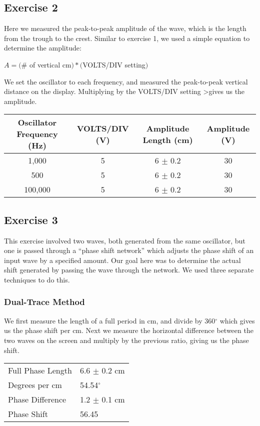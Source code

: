 \documentclass[a4paper,12pt]{article}
\begin{document}
\subsection{Exercise 2}
Here we measured the peak-to-peak amplitude of the wave, which is the
length from the trough to the crest. Similar to exercise 1, we used a
simple equation to determine the amplitude:
\begin{center}
  $A = ($\# of vertical cm$) * ($VOLTS/DIV setting$)$
\end{center}

We set the oscillator to each frequency, and measured the peak-to-peak
vertical distance on the display. Multiplying by the VOLTS/DIV setting
>gives us the amplitude. \\

\begin{tabular}{|c|c|c|c|}
  \hline
  Oscillator Frequency (Hz) & VOLTS/DIV (V) & Amplitude Length (cm) & Amplitude (V) \\
  \hline
  1,000 & 5 & 6 $\pm$ 0.2 & 30 \\
  500 & 5 & 6 $\pm$ 0.2 & 30 \\
  100,000 & 5 & 6 $\pm$ 0.2 & 30 \\
  \hline
\end{tabular}

\subsection{Exercise 3}
This exercise involved two waves, both generated from the same
oscillator, but one is passed through a ``phase shift network'' which
adjusts the phase shift of an input wave by a specified amount. Our
goal here was to determine the actual shift generated by passing the
wave through the network. We used three separate techniques to do
this.

\subsubsection{Dual-Trace Method}
We first measure the length of a full period in cm, and divide by
360$^{\circ}$ which gives us the phase shift per cm. Next we measure
the horizontal difference between the two waves on the screen and
multiply by the previous ratio, giving us the phase shift. \\

\begin{tabular}{l l}
  Full Phase Length & 6.6 $\pm$ 0.2 cm \\
  Degrees per cm & 54.54$^{\circ}$ \\
  Phase Difference & 1.2 $\pm$ 0.1 cm \\
  Phase Shift & 56.45 \\
\end{tabular}
\end{document}
